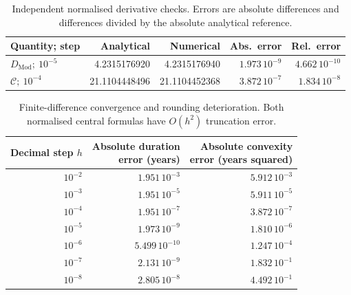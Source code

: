 \begin{table}[htbp]
\centering\footnotesize\setlength{\tabcolsep}{4pt}
\caption{Independent normalised derivative checks. Errors are absolute differences and differences divided by the absolute analytical reference.}\label{tab:derivatives}
\begin{tabular}{@{}lrrrr@{}}
\toprule
Quantity; step & Analytical & Numerical & Abs.\ error & Rel.\ error\\
\midrule
\(D_{\mathrm{Mod}};\ 10^{-5}\) & 4.2315176920 & 4.2315176940 & \(1.973\,10^{-9}\) & \(4.662\,10^{-10}\)\\
\(\mathcal C;\ 10^{-4}\) & 21.1104448496 & 21.1104452368 & \(3.872\,10^{-7}\) & \(1.834\,10^{-8}\)\\
\bottomrule
\end{tabular}
\par{}
\end{table}
\begin{table}[htbp]
\centering\footnotesize\setlength{\tabcolsep}{4pt}
\caption{Finite-difference convergence and rounding deterioration. Both normalised central formulas have \(O(h^2)\) truncation error.}\label{tab:convergence}
\begin{tabular}{@{}rrr@{}}
\toprule
Decimal step \(h\) & \shortstack{Absolute duration\\error (years)} & \shortstack{Absolute convexity\\error (years squared)}\\
\midrule
\(10^{-2}\) & \(1.951\,10^{-3}\) & \(5.912\,10^{-3}\)\\
\(10^{-3}\) & \(1.951\,10^{-5}\) & \(5.911\,10^{-5}\)\\
\(10^{-4}\) & \(1.951\,10^{-7}\) & \(3.872\,10^{-7}\)\\
\(10^{-5}\) & \(1.973\,10^{-9}\) & \(1.810\,10^{-6}\)\\
\(10^{-6}\) & \(5.499\,10^{-10}\) & \(1.247\,10^{-4}\)\\
\(10^{-7}\) & \(2.131\,10^{-9}\) & \(1.832\,10^{-1}\)\\
\(10^{-8}\) & \(2.805\,10^{-8}\) & \(4.492\,10^{-1}\)\\
\bottomrule
\end{tabular}
\par{}
\end{table}

